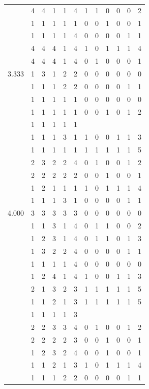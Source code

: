 \documentclass[]{msu-thesis}
\theoremstyle{definition}
\theoremstyle{definition}
\theoremstyle{definition}
\theoremstyle{remark}
\begin{document}
\begin{table}
{\begin{tabular}[t]{rrrrrrrrrrrr}
 & 4 & 4 & 1 & 1 & 4 & 1 & 1 & 0 & 0 & 0 & 2\\
 & 1 & 1 & 1 & 1 & 1 & 0 & 0 & 1 & 0 & 0 & 1\\
 & 1 & 1 & 1 & 1 & 4 & 0 & 0 & 0 & 0 & 1 & 1\\
 & 4 & 4 & 4 & 1 & 4 & 1 & 0 & 1 & 1 & 1 & 4\\
 & 4 & 4 & 4 & 1 & 4 & 0 & 1 & 0 & 0 & 0 & 1\\
3.333 & 1 & 3 & 1 & 2 & 2 & 0 & 0 & 0 & 0 & 0 & 0\\
 & 1 & 1 & 1 & 2 & 2 & 0 & 0 & 0 & 0 & 1 & 1\\
 & 1 & 1 & 1 & 1 & 1 & 0 & 0 & 0 & 0 & 0 & 0\\
 & 1 & 1 & 1 & 1 & 1 & 0 & 0 & 1 & 0 & 1 & 2\\
 & 1 & 1 & 1 & 1 & 1 &  &  &  &  &  & \\
 & 1 & 1 & 1 & 3 & 1 & 1 & 0 & 0 & 1 & 1 & 3\\
 & 1 & 1 & 1 & 1 & 1 & 1 & 1 & 1 & 1 & 1 & 5\\
 & 2 & 3 & 2 & 2 & 4 & 0 & 1 & 0 & 0 & 1 & 2\\
 & 2 & 2 & 2 & 2 & 2 & 0 & 0 & 1 & 0 & 0 & 1\\
 & 1 & 2 & 1 & 1 & 1 & 1 & 0 & 1 & 1 & 1 & 4\\
 & 1 & 1 & 1 & 3 & 1 & 0 & 0 & 0 & 0 & 1 & 1\\
4.000 & 3 & 3 & 3 & 3 & 3 & 0 & 0 & 0 & 0 & 0 & 0\\
 & 1 & 1 & 3 & 1 & 4 & 0 & 1 & 1 & 0 & 0 & 2\\
 & 1 & 2 & 3 & 1 & 4 & 0 & 1 & 1 & 0 & 1 & 3\\
 & 1 & 3 & 2 & 2 & 4 & 0 & 0 & 0 & 0 & 1 & 1\\
 & 1 & 1 & 1 & 1 & 4 & 0 & 0 & 0 & 0 & 0 & 0\\
 & 1 & 2 & 4 & 1 & 4 & 1 & 0 & 0 & 1 & 1 & 3\\
 & 2 & 1 & 3 & 2 & 3 & 1 & 1 & 1 & 1 & 1 & 5\\
 & 1 & 1 & 2 & 1 & 3 & 1 & 1 & 1 & 1 & 1 & 5\\
 & 1 & 1 & 1 & 1 & 3 &  &  &  &  &  & \\
 & 2 & 2 & 3 & 3 & 4 & 0 & 1 & 0 & 0 & 1 & 2\\
 & 2 & 2 & 2 & 2 & 3 & 0 & 0 & 1 & 0 & 0 & 1\\
 & 1 & 2 & 3 & 2 & 4 & 0 & 0 & 1 & 0 & 0 & 1\\
 & 1 & 1 & 2 & 1 & 3 & 1 & 0 & 1 & 1 & 1 & 4\\
 & 1 & 1 & 1 & 2 & 2 & 0 & 0 & 0 & 0 & 1 & 1\\

\end{tabular}}
\end{table}
\end{document}
